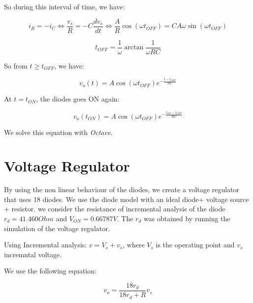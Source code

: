 So during this interval of time, we have:

\begin{equation}
  i_R = - i_C \Leftrightarrow \frac{v_s}{R} = -C\frac{dv_s}{dt} \Leftrightarrow \frac{A}{R}\cos(\omega t_{OFF}) = C A \omega \sin(\omega t_{OFF})
\end{equation}

\begin{equation}
  t_{OFF} = \frac{1}{\omega}\arctan\frac{1}{\omega RC}
\end{equation}

So from $t \geq t_{OFF}$, we have:

\begin{equation}
  v_o(t) = A\cos(\omega t_{OFF}) e^{-\frac{t-t_{OFF}}{RC}}
\end{equation}

At $t = t_{ON}$, the diodes goes ON again:

\begin{equation}
  v_o(t_{ON}) = A\cos(\omega t_{OFF}) e^{-\frac{t_{ON}-t_{OFF}}{RC}}
\end{equation}

We solve this equation with \textit{Octave}.


\section{Voltage Regulator}

By using the non linear behaviour of the diodes, we create a voltage regulator that uses 18 diodes.
We use the diode model with an ideal diode+ voltage source + resistor. we consider the resistance of incremental analysis of the diode
$r_d = 41.460 Ohm$ and $V_{ON} = 0.66787 V$. The $r_d$ was obtained by running the simulation of the voltage regulator.

Using Incremental analysis: $v = V_s + v_s$, where $V_s$ is the operating point and $v_s$ incremntal voltage.

We use the following equation:

\begin{equation}
  v_o = \frac{18 r_d}{18 r_d + R} v_s
\end{equation}






